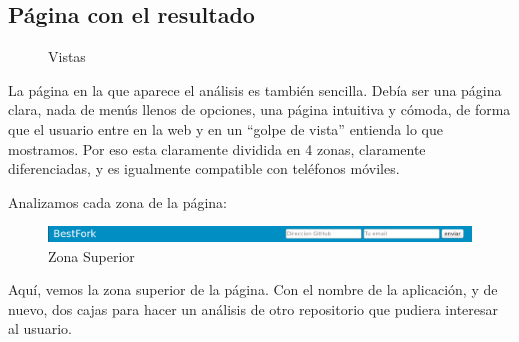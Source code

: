 \documentclass[a4paper, 12pt]{book}
\begin{document}
\subsection{Página con el resultado}

\begin{figure}[H]
 \centering
 \caption{Vistas}
 \label{f:Vistas}
\end{figure}

La página en la que aparece el análisis es también sencilla. Debía ser una página clara, nada de menús llenos de opciones, una página intuitiva y cómoda, de forma que el usuario entre en la web y en un ``golpe de vista'' entienda lo que mostramos. Por eso esta claramente dividida en 4 zonas, claramente diferenciadas, y es igualmente compatible con teléfonos móviles. 

Analizamos cada zona de la página:

\begin{figure}[hbtp]
\centering
\includegraphics[scale=0.35]{img/barrsuperior.png} 
\caption{Zona Superior}
\end{figure}

Aquí, vemos la zona superior de la página. Con el nombre de la aplicación, y de nuevo, dos cajas para hacer un análisis de otro repositorio que pudiera interesar al usuario. 
\end{document}
